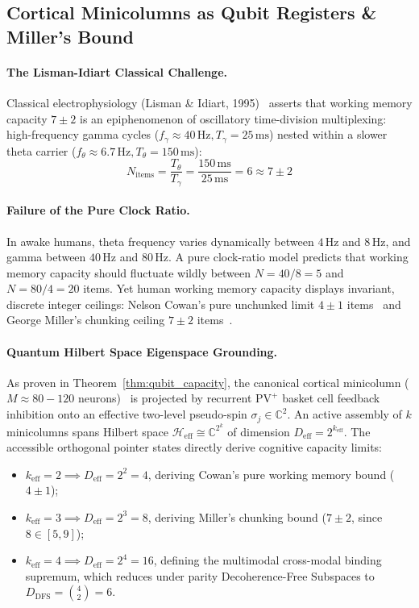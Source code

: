 \documentclass[10pt,twocolumn,3p]{article}
\begin{document}
\subsection{Cortical Minicolumns as Qubit Registers \& Miller's Bound}
\label{subsec:dial_qubit_registers}

\paragraph{The Lisman-Idiart Classical Challenge.}
Classical electrophysiology (Lisman \& Idiart, 1995)~\cite{lisman1995} asserts that working memory capacity $7 \pm 2$ is an epiphenomenon of oscillatory time-division multiplexing: high-frequency gamma cycles ($f_\gamma \approx 40\,\text{Hz}, T_\gamma = 25\,\text{ms}$) nested within a slower theta carrier ($f_\theta \approx 6.7\,\text{Hz}, T_\theta = 150\,\text{ms}$):
\begin{equation}
    N_{\text{items}} = \frac{T_\theta}{T_\gamma} = \frac{150\,\text{ms}}{25\,\text{ms}} = 6 \approx 7 \pm 2
\end{equation}

\paragraph{Failure of the Pure Clock Ratio.}
In awake humans, theta frequency varies dynamically between $4\,\text{Hz}$ and $8\,\text{Hz}$, and gamma between $40\,\text{Hz}$ and $80\,\text{Hz}$. A pure clock-ratio model predicts that working memory capacity should fluctuate wildly between $N = 40/8 = 5$ and $N = 80/4 = 20$ items. Yet human working memory capacity displays invariant, discrete integer ceilings: Nelson Cowan's pure unchunked limit $4 \pm 1$ items~\cite{cowan2001} and George Miller's chunking ceiling $7 \pm 2$ items~\cite{miller1956}.

\paragraph{Quantum Hilbert Space Eigenspace Grounding.}
As proven in Theorem~\ref{thm:qubit_capacity}, the canonical cortical minicolumn ($M \approx 80 - 120$ neurons)~\cite{mountcastle1997} is projected by recurrent $\text{PV}^+$ basket cell feedback inhibition onto an effective two-level pseudo-spin $\sigma_j \in \mathbb{C}^2$. An active assembly of $k$ minicolumns spans Hilbert space $\mathcal{H}_{\text{eff}} \cong \mathbb{C}^{2^k}$ of dimension $D_{\text{eff}} = 2^{k_{\text{eff}}}$. The accessible orthogonal pointer states directly derive cognitive capacity limits:
\begin{itemize}
    \item $k_{\text{eff}} = 2 \implies D_{\text{eff}} = 2^2 = 4$, deriving Cowan's pure working memory bound ($4 \pm 1$);
    \item $k_{\text{eff}} = 3 \implies D_{\text{eff}} = 2^3 = 8$, deriving Miller's chunking bound ($7 \pm 2$, since $8 \in [5, 9]$);
    \item $k_{\text{eff}} = 4 \implies D_{\text{eff}} = 2^4 = 16$, defining the multimodal cross-modal binding supremum, which reduces under parity Decoherence-Free Subspaces to $D_{\text{DFS}} = \binom{4}{2} = 6$.
\end{itemize}
\end{document}

